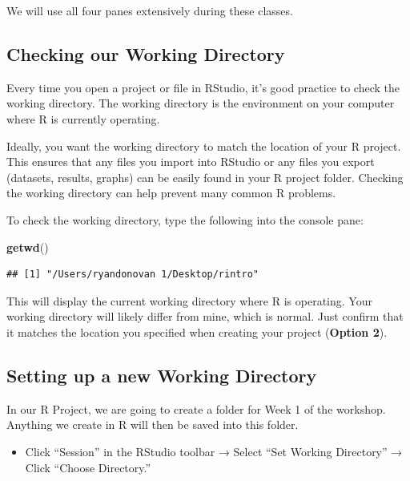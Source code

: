 \documentclass[
]{book}
\newenvironment{Shaded}{\begin{snugshade}}{\end{snugshade}}
\newcommand{\FunctionTok}[1]{\textcolor[rgb]{0.13,0.29,0.53}{\textbf{#1}}}
\newcommand{\NormalTok}[1]{#1}
\providecommand{\tightlist}{%
  \setlength{\itemsep}{0pt}\setlength{\parskip}{0pt}}
\begin{document}
We will use all four panes extensively during these classes.

\subsection{Checking our Working Directory}\label{checking-our-working-directory}

Every time you open a project or file in RStudio, it's good practice to check the working directory. The working directory is the environment on your computer where R is currently operating.

Ideally, you want the working directory to match the location of your R project. This ensures that any files you import into RStudio or any files you export (datasets, results, graphs) can be easily found in your R project folder. Checking the working directory can help prevent many common R problems.

To check the working directory, type the following into the console pane:

\begin{Shaded}
\begin{Highlighting}[]
\FunctionTok{getwd}\NormalTok{()}
\end{Highlighting}
\end{Shaded}

\begin{verbatim}
## [1] "/Users/ryandonovan 1/Desktop/rintro"
\end{verbatim}

This will display the current working directory where R is operating. Your working directory will likely differ from mine, which is normal. Just confirm that it matches the location you specified when creating your project (\textbf{Option 2}).

\subsection{Setting up a new Working Directory}\label{set_wd}

In our R Project, we are going to create a folder for Week 1 of the workshop. Anything we create in R will then be saved into this folder.

\begin{itemize}
\tightlist
\item
  Click ``Session'' in the RStudio toolbar → Select ``Set Working Directory'' → Click ``Choose Directory.''
\end{itemize}
\end{document}

